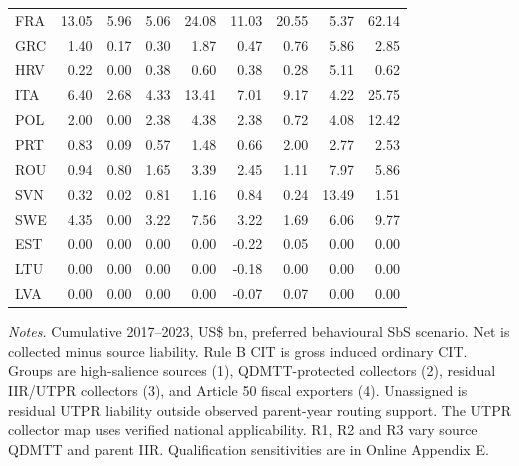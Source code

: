 \begin{table}[htbp]
\begin{tabular}{@{}lrrrrrrrr@{}}
FRA & 13.05 &  5.96 &  5.06 & 24.08 & 11.03 & 20.55 &   5.37 &  62.14 \\
GRC &  1.40 &  0.17 &  0.30 &  1.87 &  0.47 &  0.76 &   5.86 &   2.85 \\
HRV &  0.22 &  0.00 &  0.38 &  0.60 &  0.38 &  0.28 &   5.11 &   0.62 \\
ITA &  6.40 &  2.68 &  4.33 & 13.41 &  7.01 &  9.17 &   4.22 &  25.75 \\
POL &  2.00 &  0.00 &  2.38 &  4.38 &  2.38 &  0.72 &   4.08 &  12.42 \\
PRT &  0.83 &  0.09 &  0.57 &  1.48 &  0.66 &  2.00 &   2.77 &   2.53 \\
ROU &  0.94 &  0.80 &  1.65 &  3.39 &  2.45 &  1.11 &   7.97 &   5.86 \\
SVN &  0.32 &  0.02 &  0.81 &  1.16 &  0.84 &  0.24 &  13.49 &   1.51 \\
SWE &  4.35 &  0.00 &  3.22 &  7.56 &  3.22 &  1.69 &   6.06 &   9.77 \\
EST &  0.00 &  0.00 &  0.00 &  0.00 & -0.22 &  0.05 &   0.00 &   0.00 \\
LTU &  0.00 &  0.00 &  0.00 &  0.00 & -0.18 &  0.00 &   0.00 &   0.00 \\
LVA &  0.00 &  0.00 &  0.00 &  0.00 & -0.07 &  0.07 &   0.00 &   0.00 \\
\bottomrule
\end{tabular}
\par\vspace{0.6em}
\begin{minipage}{\textwidth}\footnotesize\raggedright\textit{Notes.} Cumulative 2017–2023, US\$ bn, preferred behavioural SbS scenario. Net is collected minus source liability. Rule B CIT is gross induced ordinary CIT. Groups are high-salience sources (1), QDMTT-protected collectors (2), residual IIR/UTPR collectors (3), and Article 50 fiscal exporters (4). Unassigned is residual UTPR liability outside observed parent-year routing support. The UTPR collector map uses verified national applicability. R1, R2 and R3 vary source QDMTT and parent IIR. Qualification sensitivities are in Online Appendix E.\end{minipage}
\end{table}
